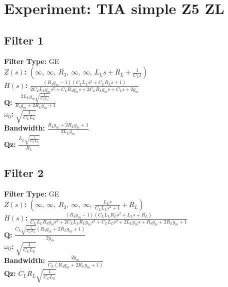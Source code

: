 \documentclass{article}
\begin{document}
        \section*{Experiment: TIA simple Z5 ZL}
\subsection*{Filter 1}
\textbf{Filter Type:} GE \\ 
\textbf{$Z(s)$:} $\left( \infty, \  \infty, \  R_{3}, \  \infty, \  \infty, \  L_{L} s + R_{L} + \frac{1}{C_{L} s}\right)$ \\ 
\textbf{$H(s)$:} $\frac{\left(R_{4} g_{m} - 1\right) \left(C_{L} L_{L} s^{2} + C_{L} R_{L} s + 1\right)}{2 C_{L} L_{L} g_{m} s^{2} + C_{L} R_{4} g_{m} s + 2 C_{L} R_{L} g_{m} s + C_{L} s + 2 g_{m}}$ \\ 
\textbf{Q:} $\frac{2 L_{L} g_{m} \sqrt{\frac{1}{C_{L} L_{L}}}}{R_{4} g_{m} + 2 R_{L} g_{m} + 1}$ \\ 
\textbf{$\omega_0$:} $\sqrt{\frac{1}{C_{L} L_{L}}}$ \\ 
\textbf{Bandwidth:} $\frac{R_{4} g_{m} + 2 R_{L} g_{m} + 1}{2 L_{L} g_{m}}$ \\ 
\textbf{Qz:} $\frac{L_{L} \sqrt{\frac{1}{C_{L} L_{L}}}}{R_{L}}$ \\ 
\subsection*{Filter 2}
\textbf{Filter Type:} GE \\ 
\textbf{$Z(s)$:} $\left( \infty, \  \infty, \  R_{3}, \  \infty, \  \infty, \  \frac{L_{L} s}{C_{L} L_{L} s^{2} + 1} + R_{L}\right)$ \\ 
\textbf{$H(s)$:} $\frac{\left(R_{4} g_{m} - 1\right) \left(C_{L} L_{L} R_{L} s^{2} + L_{L} s + R_{L}\right)}{C_{L} L_{L} R_{4} g_{m} s^{2} + 2 C_{L} L_{L} R_{L} g_{m} s^{2} + C_{L} L_{L} s^{2} + 2 L_{L} g_{m} s + R_{4} g_{m} + 2 R_{L} g_{m} + 1}$ \\ 
\textbf{Q:} $\frac{C_{L} \sqrt{\frac{1}{C_{L} L_{L}}} \left(R_{4} g_{m} + 2 R_{L} g_{m} + 1\right)}{2 g_{m}}$ \\ 
\textbf{$\omega_0$:} $\sqrt{\frac{1}{C_{L} L_{L}}}$ \\ 
\textbf{Bandwidth:} $\frac{2 g_{m}}{C_{L} \left(R_{4} g_{m} + 2 R_{L} g_{m} + 1\right)}$ \\ 
\textbf{Qz:} $C_{L} R_{L} \sqrt{\frac{1}{C_{L} L_{L}}}$ \\ 
\end{document}
